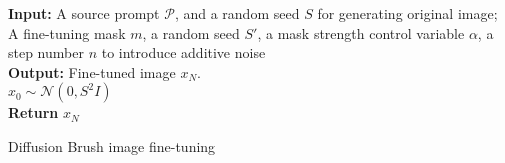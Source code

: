\documentclass[10pt,twocolumn,letterpaper]{article}
\begin{document}
\begin{algorithm}\label{alg:diff_algo}

\SetAlgoLined
\textbf{Input:} A source prompt \textbf{$\mathcal{P}$}, and a random seed \textbf{$S$} for generating original image; A fine-tuning mask \textbf{$m$}, a random seed \textbf{$S'$}, a mask strength control variable \textbf{$\alpha$}, a step number \textbf{$n$} to introduce additive noise\\
\textbf{Output:} Fine-tuned image $x_{N}$.\\
 $x_0 \sim \mathcal{N} (0,S^2 I)$  \\ 
 \textbf{Return} $x_N$
\caption{Diffusion Brush image fine-tuning}
\end{algorithm}



    
\end{document}
